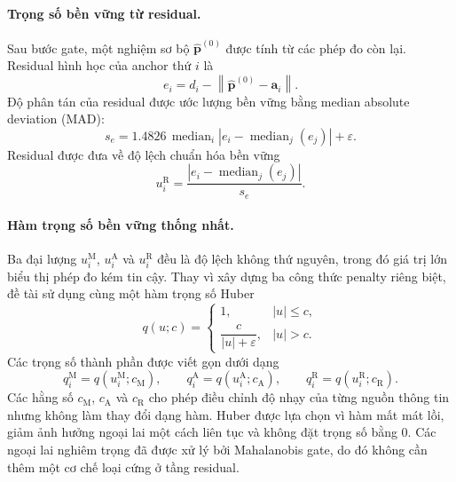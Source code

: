 \documentclass[
  a4paper,
]{report}
\begin{document}
\paragraph{Trọng số bền vững từ residual.}

Sau bước gate, một nghiệm sơ bộ $\widehat{\mathbf p}^{(0)}$ được tính từ các
phép đo còn lại. Residual hình học của anchor thứ $i$ là
\begin{equation}
  e_i=d_i-
  \left\lVert\widehat{\mathbf p}^{(0)}-\mathbf a_i\right\rVert.
  \label{eq:prefilter-geometric-residual}
\end{equation}
Độ phân tán của residual được ước lượng bền vững bằng median absolute
deviation (MAD):
\begin{equation}
  s_e=1.4826\,
  \operatorname{median}_i
  \left|e_i-\operatorname{median}_j(e_j)\right|+\varepsilon.
  \label{eq:residual-robust-scale}
\end{equation}
Residual được đưa về độ lệch chuẩn hóa bền vững
\begin{equation}
  u_i^{\mathrm{R}}=
  \frac{\left|e_i-\operatorname{median}_j(e_j)\right|}{s_e}.
  \label{eq:residual-standardized-deviation}
\end{equation}

\paragraph{Hàm trọng số bền vững thống nhất.}

Ba đại lượng $u_i^{\mathrm{M}}$, $u_i^{\mathrm{A}}$ và
$u_i^{\mathrm{R}}$ đều là độ lệch không thứ nguyên, trong đó giá trị lớn biểu
thị phép đo kém tin cậy. Thay vì xây dựng ba công thức penalty riêng biệt, đề
tài sử dụng cùng một hàm trọng số Huber
\begin{equation}
  q(u;c)=
  \begin{cases}
    1, & |u|\leq c,\\
    \dfrac{c}{|u|+\varepsilon}, & |u|>c.
  \end{cases}
  \label{eq:unified-huber-weight}
\end{equation}
Các trọng số thành phần được viết gọn dưới dạng
\begin{equation}
  q_i^{\mathrm{M}}=q(u_i^{\mathrm{M}};c_{\mathrm{M}}),\qquad
  q_i^{\mathrm{A}}=q(u_i^{\mathrm{A}};c_{\mathrm{A}}),\qquad
  q_i^{\mathrm{R}}=q(u_i^{\mathrm{R}};c_{\mathrm{R}}).
  \label{eq:component-huber-weights}
\end{equation}
Các hằng số $c_{\mathrm{M}}$, $c_{\mathrm{A}}$ và $c_{\mathrm{R}}$ cho phép
điều chỉnh độ nhạy của từng nguồn thông tin nhưng không làm thay đổi dạng hàm.
Huber được lựa chọn vì hàm mất mát lồi, giảm ảnh hưởng ngoại lai một cách liên
tục và không đặt trọng số bằng 0. Các ngoại lai nghiêm trọng đã được xử lý bởi
Mahalanobis gate, do đó không cần thêm một cơ chế loại cứng ở tầng residual.
\end{document}
